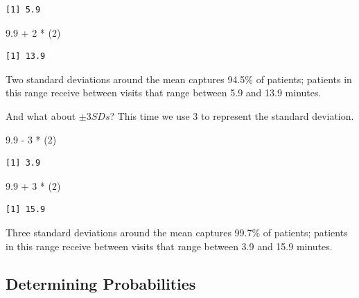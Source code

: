 \documentclass[
  11pt,
]{book}
\newenvironment{Shaded}{\begin{snugshade}}{\end{snugshade}}
\newcommand{\DecValTok}[1]{\textcolor[rgb]{0.00,0.00,0.81}{#1}}
\newcommand{\FloatTok}[1]{\textcolor[rgb]{0.00,0.00,0.81}{#1}}
\newcommand{\NormalTok}[1]{#1}
\newcommand{\SpecialCharTok}[1]{\textcolor[rgb]{0.00,0.00,0.00}{#1}}
\begin{document}
\begin{verbatim}
[1] 5.9
\end{verbatim}

\begin{Shaded}
\begin{Highlighting}[]
\FloatTok{9.9} \SpecialCharTok{+} \DecValTok{2} \SpecialCharTok{*}\NormalTok{ (}\DecValTok{2}\NormalTok{)}
\end{Highlighting}
\end{Shaded}

\begin{verbatim}
[1] 13.9
\end{verbatim}

Two standard deviations around the mean captures 94.5\% of patients; patients in this range receive between visits that range between 5.9 and 13.9 minutes.

And what about \(\pm 3SDs\)? This time we use 3 to represent the standard deviation.

\begin{Shaded}
\begin{Highlighting}[]
\FloatTok{9.9} \SpecialCharTok{{-}} \DecValTok{3} \SpecialCharTok{*}\NormalTok{ (}\DecValTok{2}\NormalTok{)}
\end{Highlighting}
\end{Shaded}

\begin{verbatim}
[1] 3.9
\end{verbatim}

\begin{Shaded}
\begin{Highlighting}[]
\FloatTok{9.9} \SpecialCharTok{+} \DecValTok{3} \SpecialCharTok{*}\NormalTok{ (}\DecValTok{2}\NormalTok{)}
\end{Highlighting}
\end{Shaded}

\begin{verbatim}
[1] 15.9
\end{verbatim}

Three standard deviations around the mean captures 99.7\% of patients; patients in this range receive between visits that range between 3.9 and 15.9 minutes.

\hypertarget{determining-probabilities}{%
\subsection{Determining Probabilities}\label{determining-probabilities}}
\end{document}
